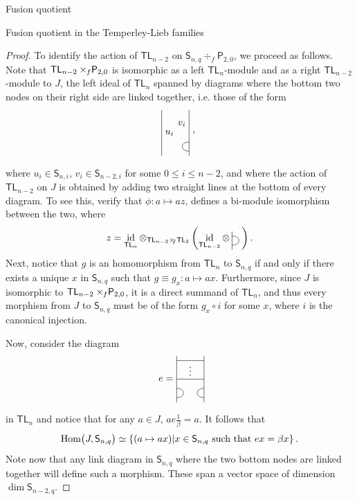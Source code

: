 \documentclass[reqno]{amsart}
\newcommand{\tl}[1]{\mathsf{TL}_{#1}}
\newcommand{\ds}[1]{\mathsf S_{#1}}
\newcommand{\dP}[1]{\mathsf P_{#1}}
\newcommand{\xf}{\times\hspace{-0.27em}_f}
\newcommand{\Hom}[1]{\text{\rm{Hom}}\big( #1 \big)}
\DeclareMathOperator{\id}{id}
\begin{document}
\begin{section}{Fusion quotient}
\begin{subsection}{Fusion quotient in the Temperley-Lieb families}
\begin{proof}
To identify the action of $\tl{n-2}$ on $\ds{n,q} \div_{f} \dP{2,0}$, we proceed as follows. Note that \linebreak
$\tl{n-2}\xf \dP{2,0}$ is isomorphic as a left $\tl{n}$-module and as a right $\tl{n-2}$-module to $J$, the left ideal of $\tl{n}$ spanned by diagrams where the bottom two nodes on their right side are linked together, i.e. those of the form
\begin{equation*}
	\begin{tikzpicture}[scale=1/3]
		\draw (0,-1/2) -- (0,9/2);
		\draw (3,-1/2) -- (3,9/2);
			\draw (3,0) .. controls (2,0) and (2,1) .. (3,1);
		\node[anchor = west] at (0,2) {$u_i$};
		\node[anchor = east] at (3,3) {$v_i$};
		\node[anchor= west] at (3,2) {,};
	\end{tikzpicture}
\end{equation*}
where $u_i \in \ds{n,i}$, $v_i \in \ds{n-2,i}$ for some $0 \leq i \leq n-2$, and where the action of $\tl{n-2}$ on $J$ is obtained by adding two straight lines at the bottom of every diagram. To see this, verify that $\phi: a \mapsto az$, defines a bi-module isomorphism between the two, where 
$$z= \id_{\tl{n}} \otimes_{\tl{n-2}\xf \tl{2}} \left(\id_{\tl{n-2}} \otimes \:\begin{tikzpicture}[baseline={(current bounding box.center)},scale=1/3]
\draw (0,-1/2) -- (0,3/2);
\draw (0,0) .. controls (1,0) and (1,1) .. (0,1);
\end{tikzpicture} \right).$$
Next, notice that $g$ is an homomorphism from $\tl{n}$ to $\ds{n,q}$ if and only if there exists a unique $x$ in $\ds{n,q}$ such that $g \equiv g_{x} :a \mapsto a x$. Furthermore, since $J$ is isomorphic to $\tl{n-2} \xf \dP{2,0}$, it is a direct summand of $\tl{n}$, and thus every morphism from $J$ to $\ds{n,q}$ must be of the form $g_{x} \circ i$ for some $x$, where $i$ is the canonical injection. 

Now, consider the diagram
\begin{equation*}
	\begin{tikzpicture}[scale=1/3]
		\draw (0,-1/2) -- (0,9/2);
		\draw (3,-1/2) -- (3,9/2);
			\draw (0,0) .. controls (1,0) and (1,1) .. (0,1);
			\draw (3,0) .. controls (2,0) and (2,1) .. (3,1);
			\draw (0,2) -- (3,2);
				\node[anchor = south] at (3/2,2) {$\vdots$};
			\draw (0,4) -- (3,4);
				\node[anchor = east] at (0,2) {$e=$};
	\end{tikzpicture}
\end{equation*}
 in $\tl{n}$ and notice that for any $a \in J$, $a e \frac{1}{\beta} = a$. It follows that $$ \Hom{J, \ds{n,q}} \simeq  \left\lbrace (a\mapsto a x)| x \in \ds{n,q} \text{ such that } e x = \beta x \right\rbrace.$$  Note now that any link diagram in $\ds{n,q}$ where the two bottom nodes are linked together will define such a morphism. These span a vector space of dimension $\dim \ds{n-2,q}$. 
 

\end{proof}
\end{subsection}
\end{section}
\end{document}
